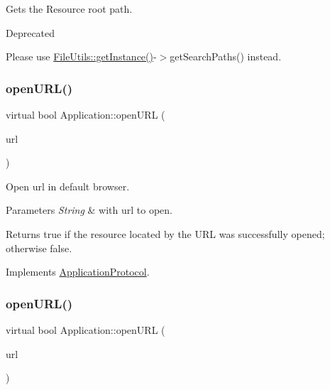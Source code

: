 Gets the Resource root path. \begin{DoxyRefDesc}{Deprecated}
\item[\hyperlink{deprecated__deprecated000124}{Deprecated}]Please use \hyperlink{classFileUtils_ac8ced4394d59f5459445ced27ccd0e8a}{File\+Utils\+::get\+Instance()}-\/$>$get\+Search\+Paths() instead. \end{DoxyRefDesc}
\mbox{\label{classApplication_a72b67fcc1ab0875ee67a95167c76db61}} 
\subsubsection{\texorpdfstring{open\+U\+R\+L()}{openURL()}\hspace{0.1cm}{\footnotesize\ttfamily [1/12]}}
{\footnotesize\ttfamily virtual bool Application\+::open\+U\+RL (\begin{DoxyParamCaption}\item[{const std\+::string \&}]{url }\end{DoxyParamCaption})\hspace{0.3cm}{\ttfamily [virtual]}}



Open url in default browser. 


\begin{DoxyParams}{Parameters}
{\em String} & with url to open. \\
\hline
\end{DoxyParams}
\begin{DoxyReturn}{Returns}
true if the resource located by the U\+RL was successfully opened; otherwise false. 
\end{DoxyReturn}


Implements \hyperlink{classApplicationProtocol_a152a977b301a90253ec5a6533b2e8e04}{Application\+Protocol}.

\mbox{\label{classApplication_a72b67fcc1ab0875ee67a95167c76db61}} 
\subsubsection{\texorpdfstring{open\+U\+R\+L()}{openURL()}\hspace{0.1cm}{\footnotesize\ttfamily [2/12]}}
{\footnotesize\ttfamily virtual bool Application\+::open\+U\+RL (\begin{DoxyParamCaption}\item[{const std\+::string \&}]{url }\end{DoxyParamCaption})\hspace{0.3cm}{\ttfamily [virtual]}}



